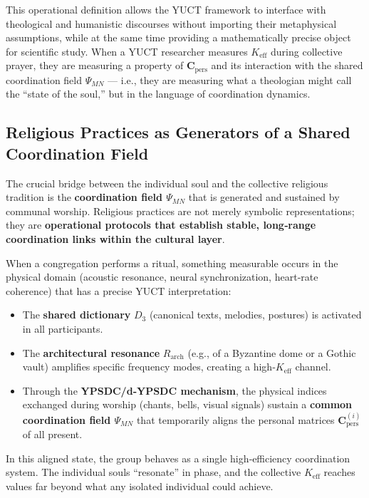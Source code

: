 \documentclass[12pt,a4paper]{article}
\begin{document}
This operational definition allows the YUCT framework to interface with
theological and humanistic discourses without importing their metaphysical
assumptions, while at the same time providing a mathematically precise
object for scientific study.  When a YUCT researcher measures
\(K_{\mathrm{eff}}\) during collective prayer, they are measuring a
property of \(\mathbf{C}_{\text{pers}}\) and its interaction with the
shared coordination field \(\Psi_{MN}\) --- i.e., they are measuring what
a theologian might call the ``state of the soul,'' but in the language
of coordination dynamics.

	\subsection{Religious Practices as Generators of a Shared Coordination Field}
	
	The crucial bridge between the individual soul and the collective religious tradition is the \textbf{coordination field \(\Psi_{MN}\)} that is generated and sustained by communal worship. Religious practices are not merely symbolic representations; they are \textbf{operational protocols that establish stable, long‑range coordination links within the cultural layer}.
	
	When a congregation performs a ritual, something measurable occurs in the physical domain (acoustic resonance, neural synchronization, heart‑rate coherence) that has a precise YUCT interpretation:
	\begin{itemize}
		\item The \textbf{shared dictionary} \(D_3\) (canonical texts, melodies, postures) is activated in all participants.
		\item The \textbf{architectural resonance} \(R_{\mathrm{arch}}\) (e.g., of a Byzantine dome or a Gothic vault) amplifies specific frequency modes, creating a high‑\(K_{\mathrm{eff}}\) channel.
		\item Through the \textbf{YPSDC/d‑YPSDC mechanism}, the physical indices exchanged during worship (chants, bells, visual signals) sustain a \textbf{common coordination field \(\Psi_{MN}\)} that temporarily aligns the personal matrices \(\mathbf{C}_{\text{pers}}^{(i)}\) of all present.
	\end{itemize}
	
	In this aligned state, the group behaves as a single high‑efficiency coordination system. The individual souls ``resonate'' in phase, and the collective \(K_{\mathrm{eff}}\) reaches values far beyond what any isolated individual could achieve.
	
\end{document}
